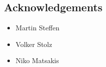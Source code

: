 \vspace*{2cm}
\thispagestyle{plain}

\begin{center}

{}

\section*{Acknowledgements}

\end{center}


\begin{itemize}
    \item Martin Steffen
    \item Volker Stolz
    \item Niko Matsakis
\end{itemize}
